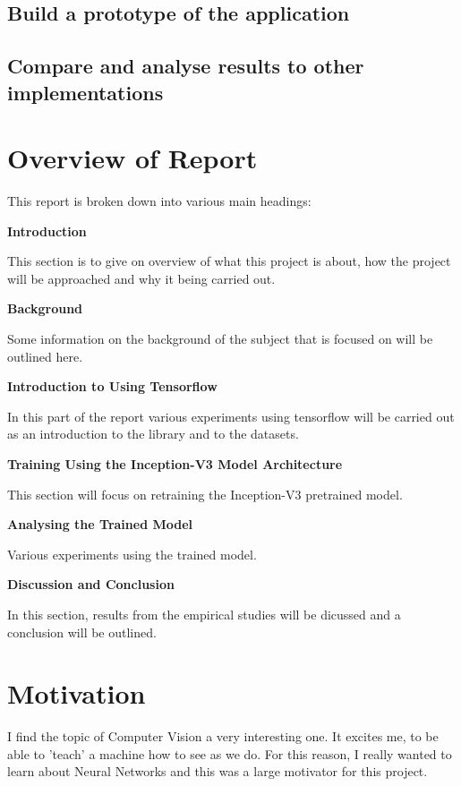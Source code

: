 \subsection*{Build a prototype of the application}

\subsection*{Compare and analyse results to other implementations}


\section{Overview of Report}

This report is broken down into various main headings:

\textbf{Introduction}

This section is to give on overview of what this project is about, how the project will be approached and why it being carried out.

\textbf{Background}

Some information on the background of the subject that is focused on will be outlined here.

\textbf{Introduction to Using Tensorflow}

In this part of the report various experiments using tensorflow will be carried out as an introduction to the library and to the datasets.

\textbf{Training Using the Inception-V3 Model Architecture}

This section will focus on retraining the Inception-V3 pretrained model.

\textbf{Analysing the Trained Model}

Various experiments using the trained model.

\textbf{Discussion and Conclusion}

In this section, results from the empirical studies will be dicussed and a conclusion will be outlined.


\section{Motivation}
I find the topic of Computer Vision a very interesting one.
It excites me, to be able to 'teach' a machine how to see as we do.
For this reason, I really wanted to learn about Neural Networks
and this was a large motivator for this project.

